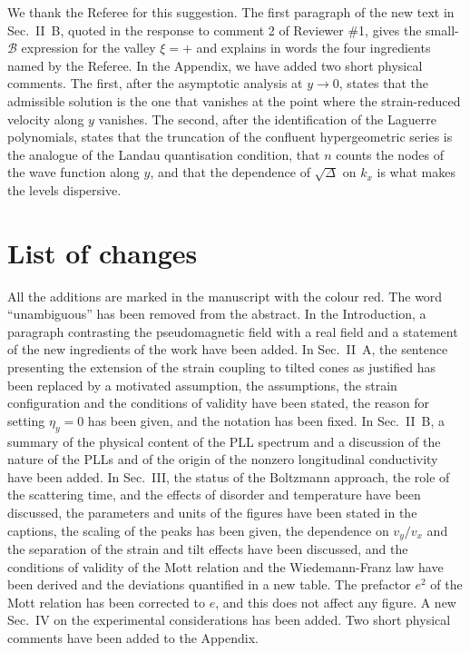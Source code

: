 \documentclass[aps,prb,onecolumn,nofootinbib,citeautoscript,10pt]{revtex4-2}
\begin{document}
\begin{enumerate}
We thank the Referee for this suggestion. The first paragraph of the new text in Sec.~II~B, quoted in the response to comment 2 of Reviewer \#1, gives the small-$\mathcal B$ expression for the valley $\xi=+$ and explains in words the four ingredients named by the Referee. In the Appendix, we have added two short physical comments. The first, after the asymptotic analysis at $y\to0$, states that the admissible solution is the one that vanishes at the point where the strain-reduced velocity along $y$ vanishes. The second, after the identification of the Laguerre polynomials, states that the truncation of the confluent hypergeometric series is the analogue of the Landau quantisation condition, that $n$ counts the nodes of the wave function along $y$, and that the dependence of $\sqrt\Delta$ on $k_x$ is what makes the levels dispersive.
\end{enumerate}

\section{List of changes}

All the additions are marked in the manuscript with the colour red. The word ``unambiguous'' has been removed from the abstract. In the Introduction, a paragraph contrasting the pseudomagnetic field with a real field and a statement of the new ingredients of the work have been added. In Sec.~II~A, the sentence presenting the extension of the strain coupling to tilted cones as justified has been replaced by a motivated assumption, the assumptions, the strain configuration and the conditions of validity have been stated, the reason for setting $\eta_y=0$ has been given, and the notation has been fixed. In Sec.~II~B, a summary of the physical content of the PLL spectrum and a discussion of the nature of the PLLs and of the origin of the nonzero longitudinal conductivity have been added. In Sec.~III, the status of the Boltzmann approach, the role of the scattering time, and the effects of disorder and temperature have been discussed, the parameters and units of the figures have been stated in the captions, the scaling of the peaks has been given, the dependence on $v_y/v_x$ and the separation of the strain and tilt effects have been discussed, and the conditions of validity of the Mott relation and the Wiedemann-Franz law have been derived and the deviations quantified in a new table. The prefactor $e^2$ of the Mott relation has been corrected to $e$, and this does not affect any figure. A new Sec.~IV on the experimental considerations has been added. Two short physical comments have been added to the Appendix. 
\end{document}

